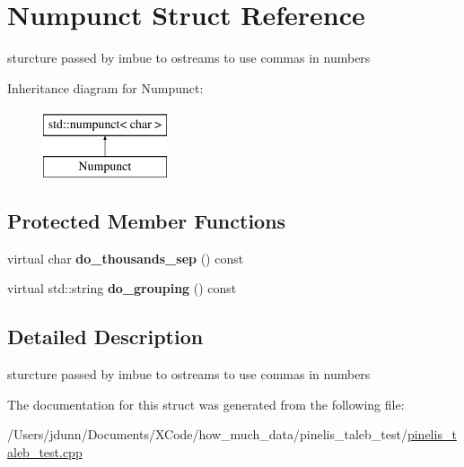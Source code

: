 \hypertarget{structNumpunct}{}\section{Numpunct Struct Reference}
\label{structNumpunct}


sturcture passed by imbue to ostreams to use commas in numbers  


Inheritance diagram for Numpunct\+:\begin{figure}[H]
\begin{center}
\leavevmode
\includegraphics[height=2.000000cm]{structNumpunct}
\end{center}
\end{figure}
\subsection*{Protected Member Functions}
\begin{DoxyCompactItemize}
\item 
\mbox{\label{structNumpunct_ab3c15bc6f961331e5ebe3657578da3a9}} 
virtual char {\bfseries do\+\_\+thousands\+\_\+sep} () const
\item 
\mbox{\label{structNumpunct_a52dd791172fbb2b434f9cd9548cd1aaa}} 
virtual std\+::string {\bfseries do\+\_\+grouping} () const
\end{DoxyCompactItemize}


\subsection{Detailed Description}
sturcture passed by imbue to ostreams to use commas in numbers 

The documentation for this struct was generated from the following file\+:\begin{DoxyCompactItemize}
\item 
/\+Users/jdunn/\+Documents/\+X\+Code/how\+\_\+much\+\_\+data/pinelis\+\_\+taleb\+\_\+test/\mbox{\hyperlink{pinelis__taleb__test_8cpp}{pinelis\+\_\+taleb\+\_\+test.\+cpp}}\end{DoxyCompactItemize}
